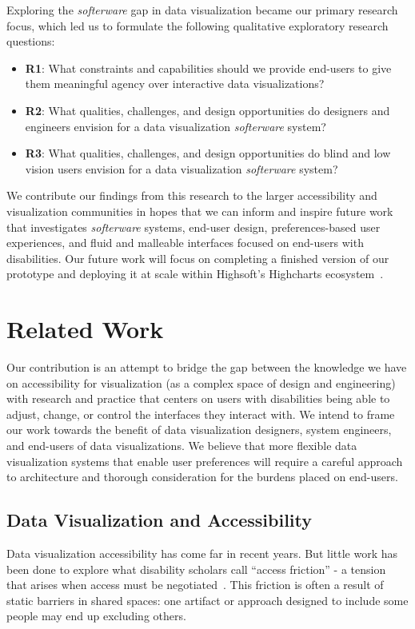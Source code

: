 \documentclass[12pt]{cmuthesis}
\begin{document}
Exploring the \textit{softerware} gap in data visualization became our primary research focus, which led us to formulate the following qualitative exploratory research questions:
\begin{itemize}
\item \textbf{R1}: What constraints and capabilities should we provide end-users to give them meaningful agency over interactive data visualizations?
\item \textbf{R2}: What qualities, challenges, and design opportunities do designers and engineers envision for a data visualization \textit{softerware} system?
\item \textbf{R3}: What qualities, challenges, and design opportunities do blind and low vision users envision for a data visualization \textit{softerware} system?
\end{itemize}

We contribute our findings from this research to the larger accessibility and visualization communities in hopes that we can inform and inspire future work that investigates \textit{softerware} systems, end-user design, preferences-based user experiences, and fluid and malleable interfaces focused on end-users with disabilities. Our future work will focus on completing a finished version of our prototype and deploying it at scale within Highsoft's Highcharts ecosystem~\cite{Highsoft}.

\section{Related Work}
Our contribution is an attempt to bridge the gap between the knowledge we have on accessibility for visualization (as a complex space of design and engineering) with research and practice that centers on users with disabilities being able to adjust, change, or control the interfaces they interact with. We intend to frame our work towards the benefit of data visualization designers, system engineers, and end-users of data visualizations. We believe that more flexible data visualization systems that enable user preferences will require a careful approach to architecture and thorough consideration for the burdens placed on end-users.

\subsection{Data Visualization and Accessibility}
Data visualization accessibility has come far in recent years. But little work has been done to explore what disability scholars call ``access friction'' - a tension that arises when access must be negotiated~\cite{Hsueh, Hamraie}. This friction is often a result of static barriers in shared spaces: one artifact or approach designed to include some people may end up excluding others.
\end{document}
